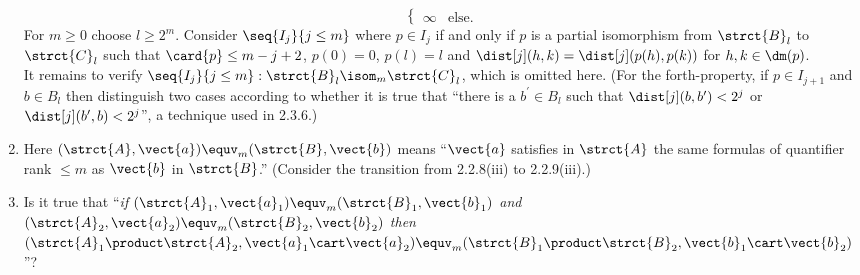 \begin{enumerate}[1.]
\[\begin{cases}
\infty & \mbox{else}.
\end{cases}
\]
For $m \geq 0$ choose $l \geq 2^m$. Consider $\seq{I_j}{j \leq m}$ where $p \in I_j$ if and only if $p$ is a partial isomorphism from $\strct{B}_l$ to $\strct{C}_l$ such that $\card{p} \leq m - j + 2$, $p(0) = 0$, $p(l) = l$ and $\dist[j](h, k) = \dist[j](p(h), p(k))$ for $h, k \in \dm(p)$.
\medskip\\
It remains to verify $\seq{I_j}{j \leq m} : \strct{B}_l \isom_m \strct{C}_l$, which is omitted here. (For the forth-property, if $p \in I_{j + 1}$ and $b \in B_l$ then distinguish two cases according to whether it is true that ``there is a $b^\prime \in B_l$ such that $\dist[j](b, b^\prime) < 2^j$ or $\dist[j](b^\prime, b) < 2^j$'', a technique used in 2.3.6.)
%
\item {} Here $(\strct{A}, \vect{a}) \equv_m (\strct{B}, \vect{b})$ means ``$\vect{a}$ satisfies in $\strct{A}$ the same formulas of quantifier rank $\leq m$ as $\vect{b}$ in $\strct{B}$.'' (Consider the transition from 2.2.8(iii) to 2.2.9(iii).)
%
\item {} Is it true that ``\emph{if $(\strct{A}_1, \vect{a}_1) \equv_m (\strct{B}_1, \vect{b}_1)$ and $(\strct{A}_2, \vect{a}_2) \equv_m (\strct{B}_2, \vect{b}_2)$ then $(\strct{A}_1 \product \strct{A}_2, \vect{a}_1 \cart \vect{a}_2) \equv_m (\strct{B}_1 \product \strct{B}_2, \vect{b}_1 \cart \vect{b}_2)$}''?


\end{enumerate}
